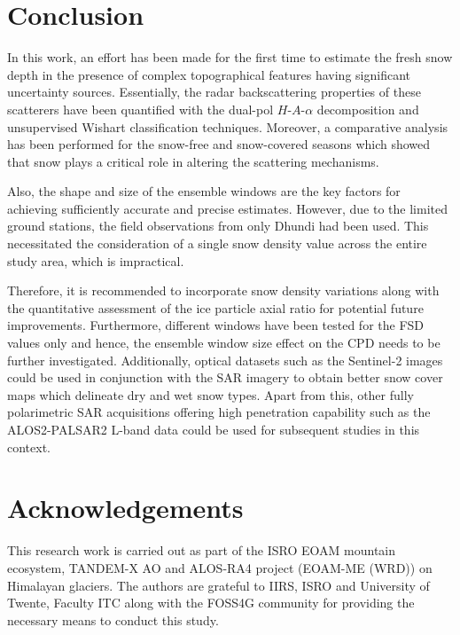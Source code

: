 \documentclass{article}
\begin{document}
\section{Conclusion}
\label{sec:concl}
In this work, an effort has been made for the first time to estimate the fresh snow depth in the presence of complex topographical features having significant uncertainty sources. Essentially, the radar backscattering properties of these scatterers have been quantified with the dual-pol $H$-$A$-$\alpha$ decomposition and unsupervised Wishart classification techniques. Moreover, a comparative analysis has been performed for the snow-free and snow-covered seasons which showed that snow plays a critical role in altering the scattering mechanisms. 

Also, the shape and size of the ensemble windows are the key factors for achieving sufficiently accurate and precise estimates. However, due to the limited ground stations, the field observations from only Dhundi had been used. This necessitated the consideration of a single snow density value across the entire study area, which is impractical.

Therefore, it is recommended to incorporate snow density variations along with the quantitative assessment of the ice particle axial ratio for potential future improvements. Furthermore, different windows have been tested for the FSD values only and hence, the ensemble window size effect on the CPD needs to be further investigated. Additionally, optical datasets such as the Sentinel-2 images could be used in conjunction with the SAR imagery to obtain better snow cover maps which delineate dry and wet snow types.  Apart from this, other fully polarimetric SAR acquisitions offering high penetration capability such as the ALOS2-PALSAR2 L-band data could be used for subsequent studies in this context. 

\section{Acknowledgements}
\label{sec: ack}
This research work is carried out as part of the ISRO EOAM mountain ecosystem, TANDEM-X AO and ALOS-RA4 project (EOAM-ME (WRD)) on Himalayan glaciers. The authors are grateful to IIRS, ISRO and University of Twente, Faculty ITC along with the FOSS4G community for providing the necessary means to conduct this study.  



\end{document}

